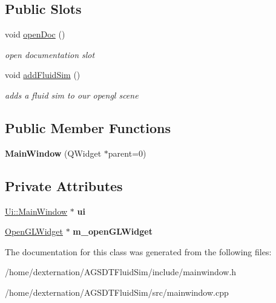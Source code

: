 \subsection*{Public Slots}
\begin{DoxyCompactItemize}
\item 
\hypertarget{class_main_window_a452fc3db76653e3355cd9eb81bc4f0cf}{void \hyperlink{class_main_window_a452fc3db76653e3355cd9eb81bc4f0cf}{open\-Doc} ()}\label{class_main_window_a452fc3db76653e3355cd9eb81bc4f0cf}

\begin{DoxyCompactList}\small\item\em open documentation slot \end{DoxyCompactList}\item 
\hypertarget{class_main_window_ab411c296f30fa6a6f7dffe17826dd85f}{void \hyperlink{class_main_window_ab411c296f30fa6a6f7dffe17826dd85f}{add\-Fluid\-Sim} ()}\label{class_main_window_ab411c296f30fa6a6f7dffe17826dd85f}

\begin{DoxyCompactList}\small\item\em adds a fluid sim to our opengl scene \end{DoxyCompactList}\end{DoxyCompactItemize}
\subsection*{Public Member Functions}
\begin{DoxyCompactItemize}
\item 
\hypertarget{class_main_window_a8b244be8b7b7db1b08de2a2acb9409db}{{\bfseries Main\-Window} (Q\-Widget $\ast$parent=0)}\label{class_main_window_a8b244be8b7b7db1b08de2a2acb9409db}

\end{DoxyCompactItemize}
\subsection*{Private Attributes}
\begin{DoxyCompactItemize}
\item 
\hypertarget{class_main_window_a35466a70ed47252a0191168126a352a5}{\hyperlink{class_ui_1_1_main_window}{Ui\-::\-Main\-Window} $\ast$ {\bfseries ui}}\label{class_main_window_a35466a70ed47252a0191168126a352a5}

\item 
\hypertarget{class_main_window_af310504f60344259d8a43e495e90e54d}{\hyperlink{class_open_g_l_widget}{Open\-G\-L\-Widget} $\ast$ {\bfseries m\-\_\-open\-G\-L\-Widget}}\label{class_main_window_af310504f60344259d8a43e495e90e54d}

\end{DoxyCompactItemize}


The documentation for this class was generated from the following files\-:\begin{DoxyCompactItemize}
\item 
/home/dexternation/\-A\-G\-S\-D\-T\-Fluid\-Sim/include/mainwindow.\-h\item 
/home/dexternation/\-A\-G\-S\-D\-T\-Fluid\-Sim/src/mainwindow.\-cpp\end{DoxyCompactItemize}
